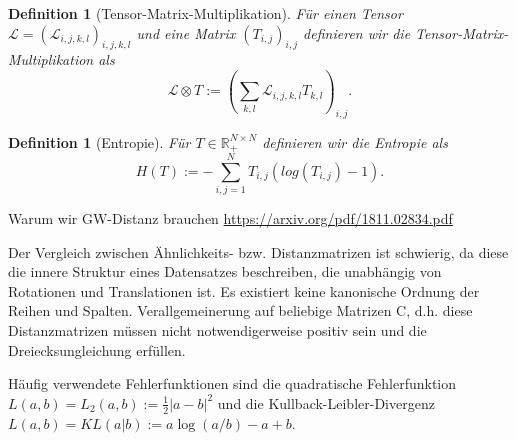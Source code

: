 \documentclass[11pt,a4paper]{article}
\newtheorem{definition}[theorem]{Definition}
\numberwithin{equation}{section}
\begin{document}

	\begin{definition}[Tensor-Matrix-Multiplikation]
		Für einen Tensor $\mathcal{L} = (\mathcal{L}_{i,j,k,l})_{i,j,k,l}$ und eine Matrix $(T_{i,j})_{i,j}$ definieren wir die Tensor-Matrix-Multiplikation als
		\begin{equation}
		\mathcal{L} \otimes T := \left(\sum_{k,l}{\mathcal{L}_{i,j,k,l}T_{k,l}}\right)_{i,j}. \label{eq:tensor_matrix_mul}
		\end{equation}
	\end{definition}
	
	\begin{definition}[Entropie]
		Für $T \in \mathbb{R}_{+}^{N \times N}$ definieren wir die Entropie als
		\begin{equation}
		H(T) := - \sum_{i,j=1}^N{T_{i,j}(log(T_{i,j})-1)}.
		\end{equation}
	\end{definition}
	
	Warum wir GW-Distanz brauchen
	\url{https://arxiv.org/pdf/1811.02834.pdf}
	
	Der Vergleich zwischen Ähnlichkeits- bzw. Distanzmatrizen ist schwierig, da diese die innere Struktur eines Datensatzes beschreiben, die unabhängig von Rotationen und Translationen ist. Es existiert keine kanonische Ordnung der Reihen und Spalten.
	Verallgemeinerung auf beliebige  Matrizen C, d.h. diese Distanzmatrizen müssen nicht notwendigerweise positiv sein und die Dreiecksungleichung erfüllen.
	
	
	
	\noindent Häufig verwendete Fehlerfunktionen sind die quadratische Fehlerfunktion $L(a,b) = L_2(a,b) := \frac{1}{2}|a-b|^2$ und die Kullback-Leibler-Divergenz $L(a,b)  = KL(a|b) := a\log(a/b) -a+b$.
	
\end{document}
